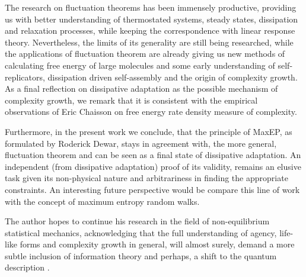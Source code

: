 \documentclass[a4paper,12pt]{article}
\begin{document}
The research on fluctuation theorems has been immensely productive, providing us with better understanding of thermostated systems, steady states, dissipation and relaxation processes, while keeping the correspondence with linear response theory. Nevertheless, the limits of its generality are still being researched, while the applications of fluctuation theorem are already giving us new methods of calculating free energy of large molecules and some early understanding of self-replicators, dissipation driven self-assembly and the origin of complexity growth. As a final reflection on dissipative adaptation as the possible mechanism of complexity growth, we remark that it is consistent with the empirical observations of Eric Chaisson \cite{Chaisson:QaChIy8J, Chaisson:inPaa3oF} on free energy rate density measure of complexity.

Furthermore, in the present work we conclude, that the principle of MaxEP, as formulated by Roderick Dewar, stays in agreement with, the more general, fluctuation theorem and can be seen as a final state of dissipative adaptation. An independent (from dissipative adaptation) proof of its validity, remains an elusive task given its non-physical nature and arbitrariness in finding the appropriate constraints. An interesting future perspective would be compare this line of work with the concept of maximum entropy random walks.

The author hopes to continue his research in the field of non-equilibrium statistical mechanics, acknowledging that the full understanding of agency, life-like forms and complexity growth in general, will almost surely, demand a more subtle inclusion of information theory and perhaps, a shift to the quantum description \cite{Kurchan:2000uh}.


\newpage



\end{document}
